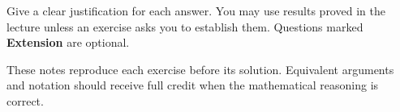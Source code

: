 
\begin{callout}[note][Instructions]
    Give a clear justification for each answer. You may use results proved in
    the lecture unless an exercise asks you to establish them. Questions marked
    \textbf{Extension} are optional.
\end{callout}

\begin{solutionsonly}
\begin{callout}[note][Instructions]
    These notes reproduce each exercise before its solution. Equivalent
    arguments and notation should receive full credit when the mathematical
    reasoning is correct.
\end{callout}
\end{solutionsonly}

